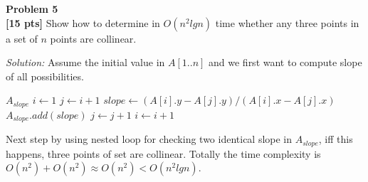 \documentclass{article}
\newenvironment{problem}[2][Problem]
    { \begin{mdframed}[backgroundcolor=gray!20] \textbf{#1 #2} \\}
    {  \end{mdframed}}
\newenvironment{solution}
    {\textit{Solution:}}
    {}
\begin{document}
\newpage
\begin{problem}{5}
\textbf{[15 pts]} Show how to determine in $O(n^2 lg n)$ time whether any three points in a set of $n$ points are collinear.
\end{problem}
\begin{solution}
	Assume the initial value in $A[1..n]$ and we first want to compute slope of all possibilities.
	\begin{algorithm}
		$A_{slope}$
		$i\gets 1$\;
		 {
			$j\gets i + 1$\;
			 {
				$slope\gets (A[i].y-A[j].y)/(A[i].x-A[j].x)$\;
				$A_{slope}.add(slope)$\;
				$j\gets j+1$\;
			}
		$i\gets i+1$\;
		}
	\end{algorithm}
	\newline
	Next step by using nested loop for checking two identical slope in $A_{slope}$, iff this happens, three points of set are collinear. Totally the time complexity is $O(n^2)+O(n^2)\approx O(n^2) < O(n^2 lg n)$.
	
	
\end{solution}
\end{document}
